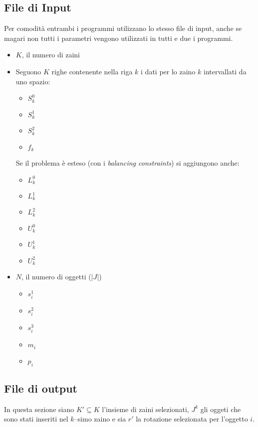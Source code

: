 \documentclass{scrartcl}
\begin{document}
\subsection{File di Input}
Per comodità entrambi i programmi utilizzano lo stesso file di input, anche se magari non tutti i parametri vengono utilizzati in tutti e due i programmi.
\begin{itemize}
	\item $K$, il numero di zaini
	\item Seguono $K$ righe contenente nella riga $k$ i dati per lo zaino $k$ intervallati da uno spazio:
	\begin{itemize}
		\item $S_k^0$
		\item $S_k^1$
		\item $S_k^2$
		\item $f_k$
	\end{itemize} 
	Se il problema è esteso (con i \emph{balancing constraints}) si aggiungono anche:
	\begin{itemize}
		\item $L_k^0$
		\item $L_k^1$
		\item $L_k^2$
		\item $U_k^0$
		\item $U_k^1$
		\item $U_k^2$
	\end{itemize}
	\item $N$, il numero di oggetti ($|J|$)
	\begin{itemize}
		\item $s_i^1$
		\item $s_i^2$
		\item $s_i^3$
		\item $m_i$
		\item $p_i$
	\end{itemize}
\end{itemize}

\subsection{File di output}
In questa sezione siano $K' \subseteq K$ l'insieme di zaini selezionati, 
$J^k$ gli oggeti che sono stati inseriti nel $k$--simo zaino e sia $r'$ la rotazione selezionata per l'oggetto $i$.
\end{document}
